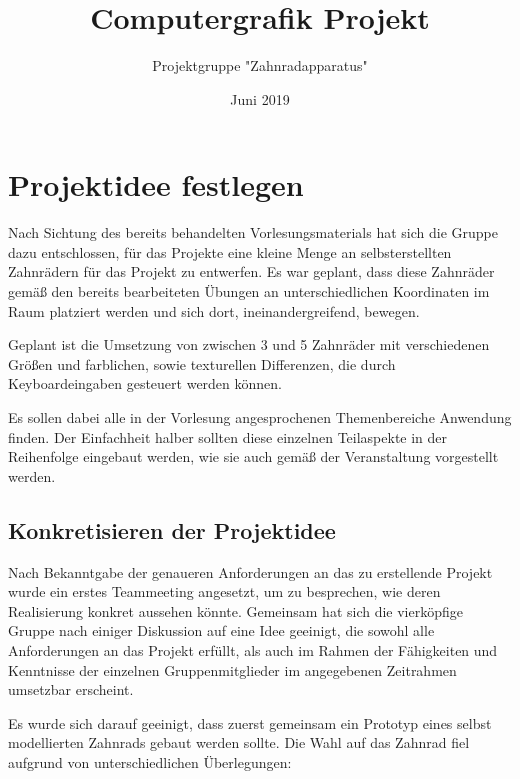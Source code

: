 \documentclass{article}
\title{Computergrafik Projekt}
\author{Projektgruppe "Zahnradapparatus" }
\date{Juni 2019}
\begin{document}
\begin{titlepage}
\maketitle
\end{titlepage}

\tableofcontents

\newpage

\section{Projektidee festlegen}
Nach Sichtung des bereits behandelten Vorlesungsmaterials hat sich die Gruppe dazu entschlossen, für das Projekte eine kleine Menge an selbsterstellten Zahnrädern für das Projekt zu entwerfen. 
Es war geplant, dass diese Zahnräder gemäß den bereits bearbeiteten Übungen an unterschiedlichen Koordinaten im Raum platziert werden und sich dort, ineinandergreifend, bewegen. 

Geplant ist die Umsetzung von zwischen 3 und 5 Zahnräder mit verschiedenen Größen und farblichen, sowie texturellen Differenzen, die durch Keyboardeingaben gesteuert werden können. 

Es sollen dabei alle in der Vorlesung angesprochenen Themenbereiche Anwendung finden. 
Der Einfachheit halber sollten diese einzelnen Teilaspekte in der Reihenfolge eingebaut werden, wie sie auch gemäß der Veranstaltung vorgestellt werden. 



\subsection{Konkretisieren der Projektidee}
Nach Bekanntgabe der genaueren Anforderungen an das zu erstellende Projekt wurde ein erstes Teammeeting angesetzt, um zu besprechen, wie deren Realisierung konkret aussehen könnte. 
Gemeinsam hat sich die vierköpfige Gruppe nach einiger Diskussion auf eine Idee geeinigt, die sowohl alle Anforderungen an das Projekt erfüllt, als auch im Rahmen der Fähigkeiten und Kenntnisse der einzelnen Gruppenmitglieder im angegebenen Zeitrahmen umsetzbar erscheint. 

Es wurde sich darauf geeinigt, dass zuerst gemeinsam ein Prototyp eines selbst modellierten Zahnrads gebaut werden sollte. 
Die Wahl auf das Zahnrad fiel aufgrund von unterschiedlichen Überlegungen:
\end{document}

